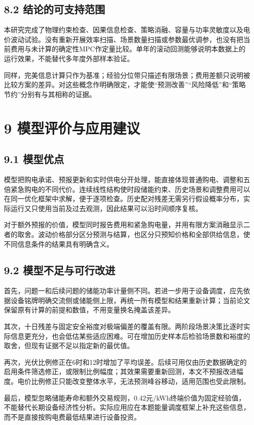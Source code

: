 \documentclass[UTF8,a4paper,zihao=-4,fontset=windows]{ctexart}
\begin{document}
\subsection{8.2 结论的可支持范围}
本研究完成了物理约束检查、因果信息检查、策略消融、容量与功率灵敏度以及电价波动试验。没有重新开展效率扫描、场景数量扫描或参数最优调参，也没有把当前费用与未计算的确定性MPC作定量比较。单年的滚动回测能够说明本数据上的运行效果，不能替代多年度外部样本验证。
\par
同样，完美信息计算只作为基准；经验分位带只描述有限场景；费用差额只说明被比较方案的差异。对这些概念作明确限定，才能使“预测改善”“风险降低”和“策略节约”分别有与其相称的证据。
\par
\section{9 模型评价与应用建议}
\subsection{9.1 模型优点}
模型把购电承诺、预报更新和实时供电分开处理，能直接体现普通购电、调整和五倍紧急购电的不同代价。连续线性结构使时段储能约束、历史场景和调整费用可以在同一优化框架中求解，便于逐项检查。历史配对残差无需另行假设概率分布，实际运行又只使用当前及过去观测，因此结果可以沿时间顺序复核。
\par
对于额外预报的价值，模型同时报告费用和紧急购电量，并用有限方案消融显示二者的取舍。波动价格部分区分预测与结算，也区分只预知价格和全部供给信息，使不同信息条件的结果具有明确含义。
\par
\subsection{9.2 模型不足与可行改进}
首先，问题一和后续问题的储能功率计量侧不同。若进一步用于设备调度，应先依据设备铭牌明确交流侧或储能侧上限，再统一所有模型和结果重新计算；当前论文保留原有计算的前提和数值，不用变量换名掩盖该差异。
\par
其次，十日残差与固定安全裕度对极端偏差的覆盖有限。两阶段场景决策比逐时实际信息更充分，也会低估某些适应困难。可在增加历史样本后检验场景数和裕度的取舍，但现有证据不足以指定新的最优值。
\par
再次，光伏比例修正在6时和12时增加了平均误差。后续可用仅由历史数据确定的启用条件筛选修正，或限制比例幅度；其效果需要重新回测，本文不预报改进幅度。电价比例修正只能改变整体水平，无法预测峰谷移动，适用范围也受此限制。
\par
最后，模型忽略储能寿命和额外交易规则，0.42元/kWh终端价值为固定经验值，不能替代长期设备经济性分析。实际应用应在本题能量调度框架上补充这些信息，而不是直接按购电费最低结果进行设备投资。
\par
\end{document}
